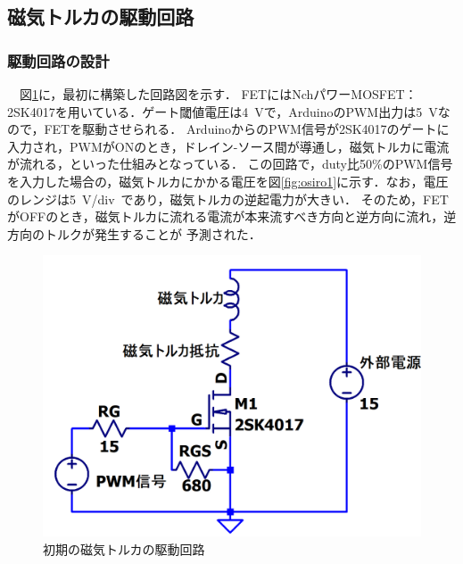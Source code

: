 \subsection{磁気トルカの駆動回路}
\subsubsection{駆動回路の設計}
　図\ref{fig:cirkit1}に，最初に構築した回路図を示す．
FETにはNchパワーMOSFET：2SK4017を用いている．ゲート閾値電圧は4~Vで，ArduinoのPWM出力は5~Vなので，FETを駆動させられる．
ArduinoからのPWM信号が2SK4017のゲートに入力され，PWMがONのとき，ドレイン-ソース間が導通し，磁気トルカに電流が流れる，といった仕組みとなっている．
この回路で，duty比50\%のPWM信号を入力した場合の，磁気トルカにかかる電圧を図\ref{fig:osiro1}に示す．なお，電圧のレンジは5~V/div~であり，磁気トルカの逆起電力が大きい．
そのため，FETがOFFのとき，磁気トルカに流れる電流が本来流すべき方向と逆方向に流れ，逆方向のトルクが発生することが
予測された．

\begin{figure}[H]
	\centering
		\includegraphics[scale=0.25]{./figure/回路図1.png}
		\caption{初期の磁気トルカの駆動回路}
		\label{fig:cirkit1}
\end{figure}

